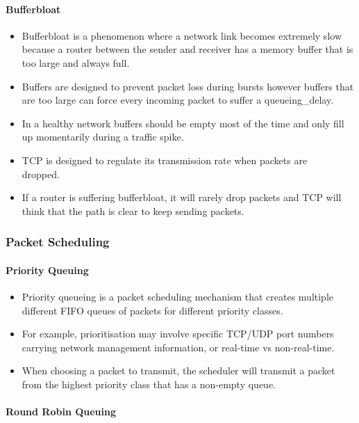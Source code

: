 \documentclass{article}
\begin{document}
\paragraph{Bufferbloat}
\begin{itemize}
    \item Bufferbloat is a phenomenon where a network link becomes extremely slow because a router between the sender and receiver has a memory buffer that is too large and always full.
    \item Buffers are designed to prevent packet loss during bursts however buffers that are too large can force every incoming packet to suffer a \gls*{queueing_delay}.
    \item In a healthy network buffers should be empty most of the time and only fill up momentarily during a traffic spike.
    \item TCP is designed to regulate its transmission rate when packets are\\ dropped.
    \item If a router is suffering bufferbloat, it will rarely drop packets and TCP will think that the path is clear to keep sending packets.
\end{itemize}

\subsubsection{Packet Scheduling}

\paragraph{Priority Queuing}

\begin{itemize}
    \item Priority queueing is a packet scheduling mechanism that creates multiple different FIFO queues of packets for different priority classes.
    \item For example, prioritisation may involve specific TCP/UDP port numbers carrying network management information, or real-time vs non-real-time.
    \item When choosing a packet to transmit, the scheduler will transmit a packet from the highest priority class that has a non-empty queue.
\end{itemize}

\paragraph{Round Robin Queuing}
\end{document}

